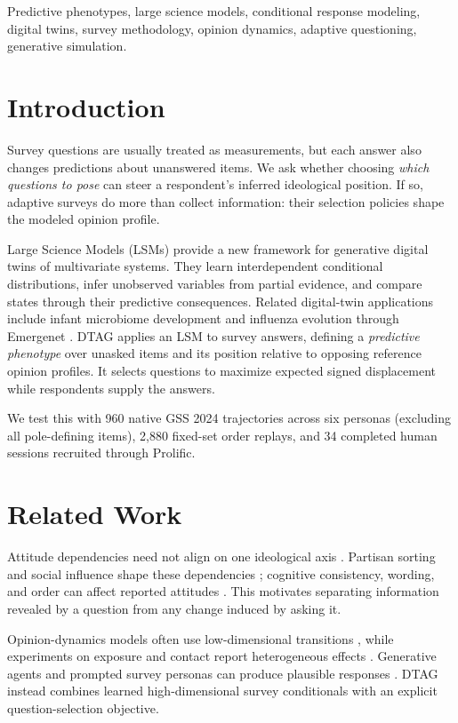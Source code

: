 \documentclass[technote,10pt]{IEEEtran}
\begin{document}
\begin{IEEEkeywords}
Predictive phenotypes, large science models, conditional response modeling, digital twins, survey methodology, opinion dynamics, adaptive questioning, generative simulation.
\end{IEEEkeywords}

\section{Introduction}
Survey questions are usually treated as measurements, but each answer also changes predictions about unanswered items. We ask whether choosing \emph{which questions to pose} can steer a respondent's inferred ideological position. If so, adaptive surveys do more than collect information: their selection policies shape the modeled opinion profile.

Large Science Models (LSMs) provide a new framework for generative digital twins of multivariate systems. They learn interdependent conditional distributions, infer unobserved variables from partial evidence, and compare states through their predictive consequences. Related digital-twin applications include infant microbiome development \cite{sizemore2024} and influenza evolution through Emergenet \cite{wu2026emergenet}. DTAG applies an LSM to survey answers, defining a \emph{predictive phenotype} over unasked items and its position relative to opposing reference opinion profiles. It selects questions to maximize expected signed displacement while respondents supply the answers.

We test this with 960 native GSS 2024 trajectories across six personas (excluding all pole-defining items), 2,880 fixed-set order replays, and 34 completed human sessions recruited through Prolific.
\section{Related Work}
Attitude dependencies need not align on one ideological axis \cite{converse1964,zaller1992}. Partisan sorting and social influence shape these dependencies \cite{baldassarri2008,dellaposta2015}; cognitive consistency, wording, and order can affect reported attitudes \cite{festinger1957,schwarz1999,taber2006}. This motivates separating information revealed by a question from any change induced by asking it.

Opinion-dynamics models often use low-dimensional transitions \cite{degroot1974,friedkin1990,hegselmann2002}, while experiments on exposure and contact report heterogeneous effects \cite{bail2018,kalla2018,broockman2016}. Generative agents and prompted survey personas can produce plausible responses \cite{argyle2023,park2023}. DTAG instead combines learned high-dimensional survey conditionals with an explicit question-selection objective.
\end{document}
